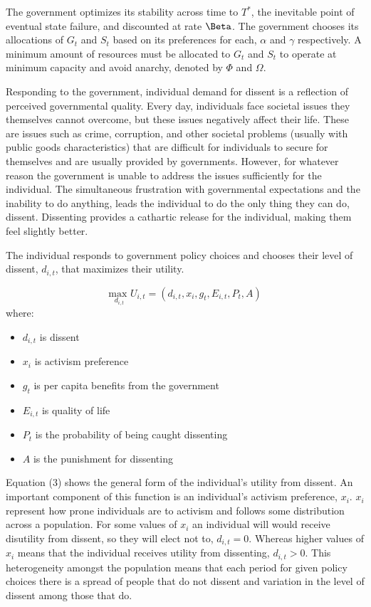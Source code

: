 \documentclass[12pt]{article}
\begin{document}
\begin{spacing}{1.5}
The government optimizes its stability across time to $T^*$, the inevitable point of eventual state failure, and discounted at rate $\Beta$. The government chooses its allocations of $G_t$ and $S_t$ based on its preferences for each, $\alpha$ and $\gamma$ respectively. A minimum amount of resources must be allocated to $G_t$ and $S_t$ to operate at minimum capacity and avoid anarchy, denoted by $\Phi$ and $\Omega$. 

Responding to the government, individual demand for dissent is a reflection of perceived governmental quality. Every day, individuals face societal issues they themselves cannot overcome, but these issues negatively affect their life. These are issues such as crime, corruption, and other societal problems (usually with public goods characteristics) that are difficult for individuals to secure for themselves and are usually provided by governments. However, for  whatever reason the government is unable to address the issues sufficiently for the individual. The simultaneous frustration with governmental expectations and the inability to do anything, leads the individual to do the only thing they can do, dissent. Dissenting provides a cathartic release for the individual, making them feel slightly better.

The individual responds to government policy choices and chooses their level of dissent, $d_{i,t}$, that maximizes their utility.  

\vspace{.5 em}
\begin{equation}
{\underset{d_{i,t}}{\text{max }}}  U_{i,t}= (d_{i,t},x_i,g_t, E_{i,t},P_t, A)
\end{equation}
where: 
\begin{spacing}{1}
\begin{itemize}
\item $d_{i,t}$ is dissent
\item $x_i$ is activism preference 
\item $g_t$ is per capita benefits from the government 
\item $E_{i,t}$ is quality of life  
\item $P_t$ is the probability of being caught dissenting
\item $A$ is the punishment for dissenting	
\end{itemize}
\end{spacing}

Equation (3) shows the general form of the individual's utility from dissent. An important component of this function is an individual's activism preference, $x_i$. $x_i$ represent how prone individuals are to activism and follows some distribution across a population. For some values of $x_i$ an individual will would receive disutility from dissent, so they will elect not to, $d_{i,t}=0$. Whereas higher values of $x_i$ means that the individual receives utility from dissenting, $d_{i,t}>0$. This heterogeneity amongst the population means that each period for given policy choices there is a spread of people that do not dissent and variation in the level of dissent among those that do.  


\end{spacing}
\end{document}
